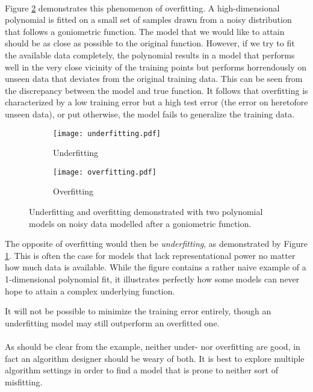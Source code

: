 \paragraph{}
Figure
\ref{fig:overfitting}
demonstrates this phenomenon of overfitting.
A high-dimensional polynomial is fitted on
a small set of samples drawn from a noisy
distribution that follows a goniometric function.
The model that we would like to attain
should be as close as possible to the original function.
However, if we try to fit the available data completely,
the polynomial results in a model that performs
well in the very close vicinity of the training points
but performs horrendously on unseen data
that deviates from the original training data.
This can be seen from the discrepancy
between the model and true function.
It follows that overfitting is characterized by
a low training error but a high test error
(the error on heretofore unseen data),
or put otherwise,
the model fails to generalize the training data.

\begin{figure}[h]
\center
\begin{subfigure}{.49\textwidth}
  \centering
  \texttt{[image: underfitting.pdf]}
  \caption{Underfitting}
  \label{fig:underfitting}
\end{subfigure}
\begin{subfigure}{.49\textwidth}
  \centering
  \texttt{[image: overfitting.pdf]}
  \caption{Overfitting}
  \label{fig:overfitting}
\end{subfigure}

\label{fig:fitting}
\caption{
Underfitting and overfitting
demonstrated with two polynomial
models on noisy data modelled
after a goniometric function.
}
\end{figure}

The opposite of overfitting would then be \textit{underfitting},
as demonstrated by Figure \ref{fig:underfitting}.
This is often the case for models that lack
representational power
no matter how much data is available.
While the figure contains a rather naive example
of a 1-dimensional polynomial fit,
it illustrates perfectly how some models
can never hope to attain a complex underlying function.

It will not be possible to minimize the training error entirely,
though an underfitting model may still outperform
an overfitted one.

\paragraph{}
As should be clear from the example,
neither under- nor overfitting are good,
in fact an algorithm designer
should be weary of both.
It is best to explore multiple
algorithm settings in order to find
a model that is prone to
neither sort of misfitting.

